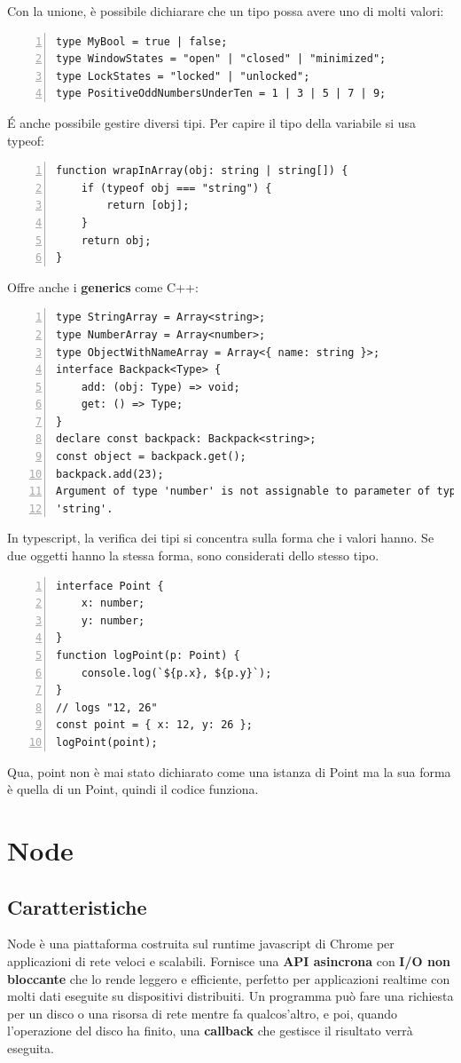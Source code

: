 Con la unione, è possibile dichiarare che un tipo possa avere uno di molti valori:
\begin{Verbatim}[frame = single, numbers = left]
type MyBool = true | false;
type WindowStates = "open" | "closed" | "minimized";
type LockStates = "locked" | "unlocked";
type PositiveOddNumbersUnderTen = 1 | 3 | 5 | 7 | 9;
\end{Verbatim}
\'E anche possibile gestire diversi tipi. Per capire il tipo della variabile si usa typeof:
\begin{Verbatim}[frame = single, numbers = left]
function wrapInArray(obj: string | string[]) {
    if (typeof obj === "string") {
        return [obj];
    }
    return obj;
}
\end{Verbatim}
Offre anche i \textbf{generics} come C++:
\begin{Verbatim}[frame = single, numbers = left]
type StringArray = Array<string>;
type NumberArray = Array<number>;
type ObjectWithNameArray = Array<{ name: string }>;
interface Backpack<Type> {
    add: (obj: Type) => void;
    get: () => Type;
}
declare const backpack: Backpack<string>;
const object = backpack.get();
backpack.add(23);
Argument of type 'number' is not assignable to parameter of type
'string'.
\end{Verbatim}
In typescript, la verifica dei tipi si concentra sulla forma che i valori hanno. Se due oggetti hanno la stessa forma, sono considerati dello stesso tipo.
\begin{Verbatim}[frame = single, numbers = left]
interface Point {
    x: number;
    y: number;
}
function logPoint(p: Point) {
    console.log(`${p.x}, ${p.y}`);
}
// logs "12, 26"
const point = { x: 12, y: 26 };
logPoint(point);
\end{Verbatim}
Qua, point non è mai stato dichiarato come una istanza di Point ma la sua forma è quella di un Point, quindi il codice funziona.



\chapter{Node}
\section{Caratteristiche}
Node è una piattaforma costruita sul runtime javascript di Chrome per applicazioni di rete veloci e scalabili. Fornisce una \textbf{API asincrona} con \textbf{I/O non bloccante} che lo rende leggero e efficiente, perfetto per applicazioni realtime con molti dati eseguite su dispositivi distribuiti. 
Un programma può fare una richiesta per un disco o una risorsa di rete mentre fa qualcos'altro, e poi, quando l'operazione del disco ha finito, una \textbf{callback} che gestisce il risultato verrà eseguita. 

